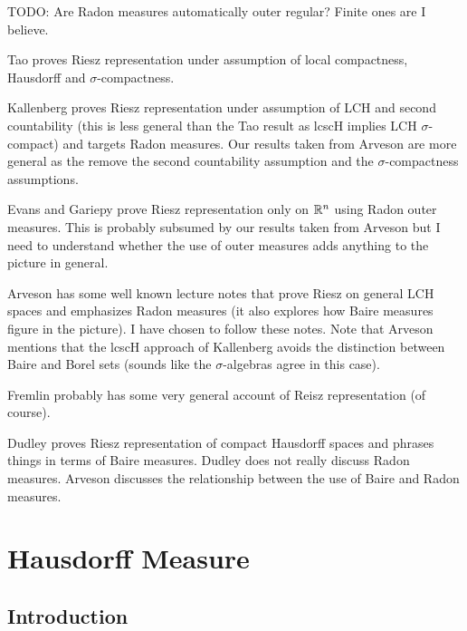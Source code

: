 TODO: Are Radon measures automatically outer regular?  Finite ones are
I believe.

Tao proves Riesz representation under assumption of local compactness, Hausdorff
and $\sigma$-compactness.

Kallenberg proves Riesz representation under assumption of LCH and
second countability (this is less general than the Tao
result as lcscH implies LCH $\sigma$-compact)
and targets Radon measures.  Our results taken from Arveson are more
general as the remove the second countability assumption and the $\sigma$-compactness
assumptions.

Evans and Gariepy prove Riesz representation only on $\mathbb{R}^n$ using
Radon outer measures.  This is probably subsumed by our results taken
from Arveson but I need to understand whether the use of outer
measures adds anything to the picture in general.

Arveson has some well known lecture notes that prove Riesz on general
LCH spaces
and emphasizes Radon measures (it also explores how Baire measures figure in the
picture).  I have chosen to follow these notes.  Note that Arveson
mentions that the lcscH approach of Kallenberg avoids the distinction
between Baire and Borel sets (sounds like the $\sigma$-algebras agree
in this case).

Fremlin probably has some very general account of Reisz representation
(of course).

Dudley proves Riesz representation of compact Hausdorff spaces and
phrases things in terms of Baire measures.  Dudley does not really
discuss Radon measures.  Arveson discusses the relationship between
the use of Baire and Radon measures.

\section{Hausdorff Measure}

\subsection{Introduction}

